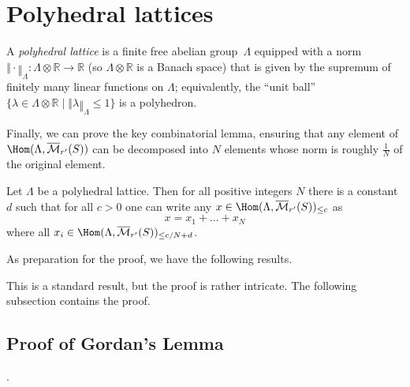 \section{Polyhedral lattices}
\label{sec:polyhedral_lattice}

\begin{definition}
  \label{polyhedral_lattice}
  A \emph{polyhedral lattice} is a finite free abelian group~$\Lambda$
  equipped with a norm $‖\cdot‖_\Lambda \colon \Lambda\otimes \mathbb R\to \mathbb R$
  (so $\Lambda\otimes \mathbb R$ is a Banach space)
  that is given by the supremum of finitely many linear functions on $\Lambda$;
  equivalently, the ``unit ball''
  $\{\lambda\in \Lambda\otimes \mathbb R\mid ‖\lambda‖_\Lambda\leq 1\}$ is a polyhedron.
\end{definition}

Finally, we can prove the key combinatorial lemma,
ensuring that any element of $\Hom(\Lambda,\overline{\mathcal M}_{r'}(S))$
can be decomposed into $N$ elements whose norm is roughly $\tfrac 1N$ of the original element.

\begin{lemma}
  \label{combi}
  \leanok
  Let $\Lambda$ be a polyhedral lattice.
  Then for all positive integers $N$ there is a constant $d$
  such that for all $c>0$ one can write any
  $x\in \Hom(\Lambda,\overline{\mathcal M}_{r'}(S))_{\leq c}$ as
  \[
    x=x_1+\ldots+x_N
  \]
  where all $x_i\in \Hom(\Lambda,\overline{\mathcal M}_{r'}(S))_{\leq c/N+d}$.
\end{lemma}

As preparation for the proof, we have the following results.

This is a standard result, but the proof is rather intricate. The following subsection contains the proof.

\subsection{Proof of Gordan's Lemma}.

